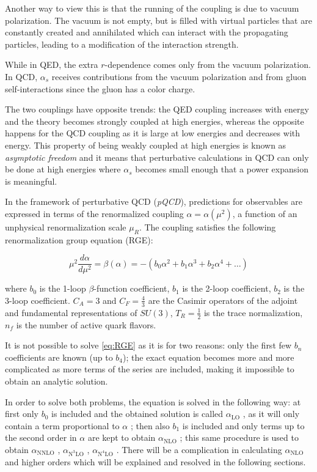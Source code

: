 \documentclass[../main.tex]{subfiles}
\begin{document}
Another way to view this is that the running of the coupling is due to vacuum polarization. The vacuum is not empty, but is filled 
with virtual particles that are constantly created and annihilated which can interact with the propagating particles,
leading to a modification of the interaction strength. 

While in QED, the extra $r$-dependence comes only from the vacuum polarization. In QCD, 
$\alpha_s$ receives contributions from the vacuum polarization and from gluon self-interactions since the gluon 
has a color charge.

The two couplings have opposite trends: the QED coupling increases with energy and the theory becomes strongly
coupled at high energies, whereas the opposite happens for the QCD coupling as it is large at low
energies and decreases with energy. This property of being weakly coupled at high energies is
known as \emph{asymptotic freedom} and it means that perturbative calculations in QCD can only be
done at high energies where $\alpha_s$ becomes small enough that a power expansion is meaningful.


In the framework of perturbative QCD (\emph{pQCD}), predictions for observables are expressed in
terms of the renormalized coupling $\alpha = \alpha (\mu^2)$, a function of an unphysical renormalization scale
$\mu_R$. 
The coupling satisfies the following renormalization group equation (RGE):

\begin{equation}\label{eq:RGE}
    \mu^2 \frac{d\alpha}{d\mu^2} = \beta(\alpha) = -\left( b_0 \alpha^2 + b_1 \alpha^3 + b_2 \alpha^4 + \ldots \right)
\end{equation}

where $b_0$ is the 1-loop $\beta$-function coefficient,  
$b_1$ is the 2-loop coefficient, 
$b_2$ is the 3-loop coefficient.
$C_A = 3$ and $C_F = \frac{4}{3}$ are the Casimir operators of the adjoint and fundamental representations of $SU(3)$,
$T_R = \frac{1}{2}$ is the trace normalization, $n_f$ is the number of active quark flavors. 

It is not possible to solve \cref{eq:RGE} as it is for two reasons: only the first few $b_n$ 
coefficients are known (up to $b_4$); the exact equation becomes more and more complicated 
as more terms of the series are included, making it impossible to obtain an analytic solution.

In order to solve both problems, the equation is solved in the following way: at first only $b_0$
is included and the obtained solution is called $\alpha_{\text{LO}}$ , as it will only contain a term proportional to
$\alpha$ ; then also $b_1$ is included and only terms up to the second order in $\alpha$ are kept to obtain $\alpha_{\text{NLO}}$ ;
this same procedure is used to obtain $\alpha_{\text{NNLO}}$ , $\alpha_{\text{N}^3\text{LO}}$ , $\alpha_{\text{N}^4\text{LO}}$ . There will be a complication in
calculating $\alpha_{\text{NLO}}$ and higher orders which will be explained and resolved in the following sections.
\end{document}
